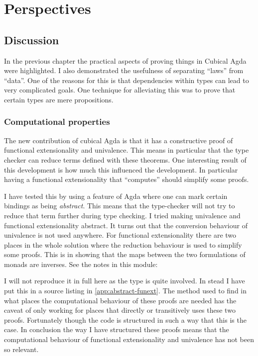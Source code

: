 \chapter{Perspectives}
\section{Discussion}
In the previous chapter the practical aspects of proving things in
Cubical Agda were highlighted.  I also demonstrated the usefulness of
separating ``laws'' from ``data''.  One of the reasons for this is that
dependencies within types can lead to very complicated goals.  One
technique for alleviating this was to prove that certain types are
mere propositions.

\subsection{Computational properties}
The new contribution of cubical Agda is that it has a constructive
proof of functional extensionality
and univalence.  This means in particular that the
type checker can reduce terms defined with these theorems.  One
interesting result of this development is how much this influenced the
development.  In particular having a functional extensionality that
``computes'' should simplify some proofs.

I have tested this by using a feature of Agda where one can mark
certain bindings as being \emph{abstract}.  This means that the
type-checker will not try to reduce that term further during type
checking.  I tried making univalence and functional extensionality
abstract.  It turns out that the conversion behaviour of univalence is
not used anywhere.  For functional extensionality there are two places
in the whole solution where the reduction behaviour is used to
simplify some proofs.  This is in showing that the maps between the
two formulations of monads are inverses.  See the notes in this
module:
%
\begin{center}
\end{center}
%

I will not reproduce it in full here as the type is quite involved. In
stead I have put this in a source listing in
\ref{app:abstract-funext}.  The method used to find in what places the
computational behaviour of these proofs are needed has the caveat of
only working for places that directly or transitively uses these two
proofs.  Fortunately though the code is structured in such a way that
this is the case. In conclusion the way I have structured these proofs
means that the computational behaviour of functional extensionality
and univalence has not been so relevant.

